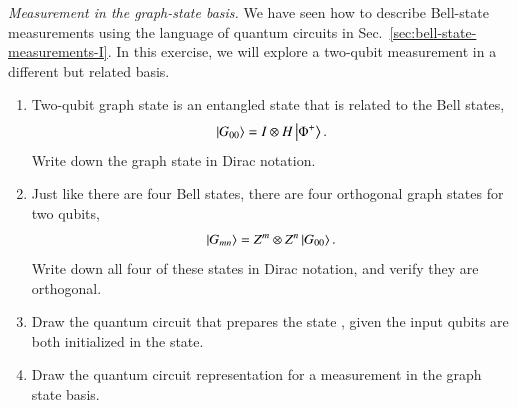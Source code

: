 \begin{exercise}
\emph{Measurement in the graph-state basis.} We have seen how to describe Bell-state measurements using the language of quantum circuits in Sec.~\ref{sec:bell-state-measurements-I}. In this exercise, we will explore a two-qubit measurement in a different but related basis.
\begin{enumerate}[label=(\alph*)]
    \item Two-qubit graph state is an entangled state that is related to the Bell states,
    \begin{equation*}
        \left| G_{00} \right\rangle = I \otimes H \left| \Phi^+ \right\rangle.
    \end{equation*}
    Write down the graph state  in Dirac notation.
    \item Just like there are four Bell states, there are four orthogonal graph states for two qubits,
    \begin{equation*}
        \left| G_{mn} \right\rangle = Z^m \otimes Z^n \left| G_{00} \right\rangle.
    \end{equation*}
    Write down all four of these states in Dirac notation, and verify they are orthogonal.
    \item Draw the quantum circuit that prepares the state , given the input qubits are both initialized in the  state.
    \item Draw the quantum circuit representation for a measurement in the graph state basis.
\end{enumerate}
\end{exercise}
